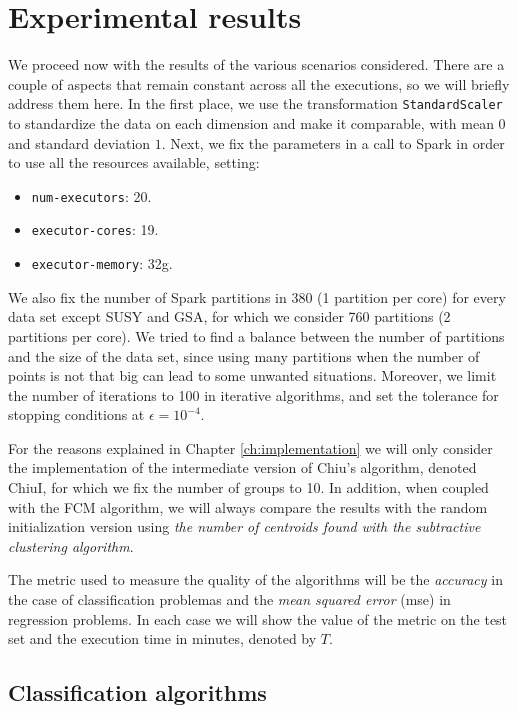 \section{Experimental results}

We proceed now with the results of the various scenarios considered. There are a couple of aspects that remain constant across all the executions, so we will briefly address them here. In the first place, we use the transformation \verb|StandardScaler| to standardize the data on each dimension and make it comparable, with mean $0$ and standard deviation $1$. Next, we fix the parameters in a call to Spark in order to use all the resources available, setting:

\begin{itemize}
  \item \verb|num-executors|: 20.
  \item \verb|executor-cores|: 19.
  \item \verb|executor-memory|: 32g.
\end{itemize}
We also fix the number of Spark partitions in 380 (1 partition per core) for every data set except SUSY and GSA, for which we consider 760 partitions (2 partitions per core). We tried to find a balance between the number of partitions and the size of the data set, since using many partitions when the number of points is not that big can lead to some unwanted situations. Moreover, we limit the number of iterations to 100 in iterative algorithms, and set the tolerance for stopping conditions at $\epsilon=10^{-4}$.

For the reasons explained in Chapter \ref{ch:implementation} we will only consider the implementation of the intermediate version of Chiu's algorithm, denoted ChiuI, for which we fix the number of groups to 10. In addition, when coupled with the FCM algorithm, we will always compare the results with the random initialization version using \textit{the number of centroids found with the subtractive clustering algorithm}.

The metric used to measure the quality of the algorithms will be the \textit{accuracy} in the case of classification problemas and the \textit{mean squared error} (\acrshort{mse}) in regression problems. In each case we will show the value of the metric on the test set and the execution time in minutes, denoted by $T$.

\subsection{Classification algorithms}

